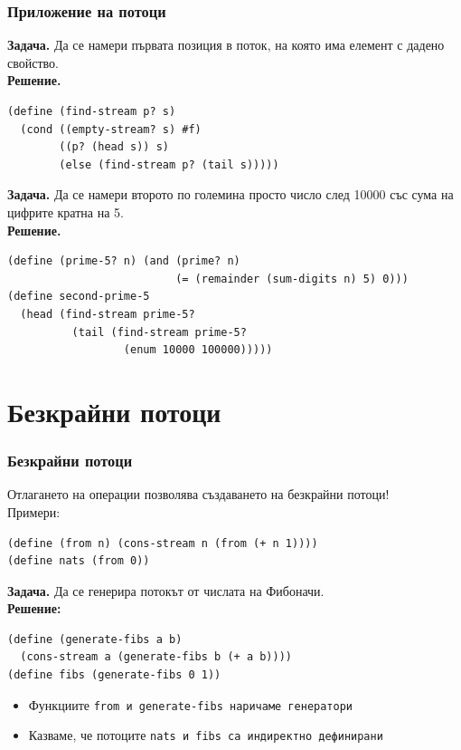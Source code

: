 \documentclass[alsotrans,beameroptions={aspectratio=169}]{beamerswitch}
\begin{document}
\begin{frame}[fragile]
  \frametitle{Приложение на потоци}

  \small
  \textbf{Задача.} Да се намери първата позиция в поток, на която има елемент с дадено свойство.\\
  \pause
  \textbf{Решение.}
\begin{lstlisting}
(define (find-stream p? s)
  (cond ((empty-stream? s) #f)
        ((p? (head s)) s)
        (else (find-stream p? (tail s)))))
\end{lstlisting}
  \pause
  \textbf{Задача.} Да се намери второто по големина просто число след 10000 със сума на цифрите кратна на 5.\\
  \pause
  \textbf{Решение.}
\begin{lstlisting}
(define (prime-5? n) (and (prime? n)
                          (= (remainder (sum-digits n) 5) 0)))
(define second-prime-5
  (head (find-stream prime-5?
          (tail (find-stream prime-5?
                  (enum 10000 100000)))))
\end{lstlisting}
\end{frame}

\section{Безкрайни потоци}

\begin{frame}[fragile]
  \frametitle{Безкрайни потоци}

  Отлагането на операции позволява създаването на \alert{безкрайни потоци}!\\[1em]
  \pause
  Примери:
\begin{lstlisting}
(define (from n) (cons-stream n (from (+ n 1))))
(define nats (from 0))
\end{lstlisting}
  \pause
  \textbf{Задача.} Да се генерира потокът от числата на Фибоначи.\\
  \pause
  \textbf{Решение:}
\begin{lstlisting}
(define (generate-fibs a b)
  (cons-stream a (generate-fibs b (+ a b))))
(define fibs (generate-fibs 0 1))
\end{lstlisting}
  \pause
  \begin{itemize}
  \item Функциите \tt{from} и \tt{generate-fibs} наричаме \alert{генератори}
  \item Казваме, че потоците \tt{nats} и \tt{fibs} са \alert{индиректно дефинирани}
  \end{itemize}
\end{frame}
\end{document}
